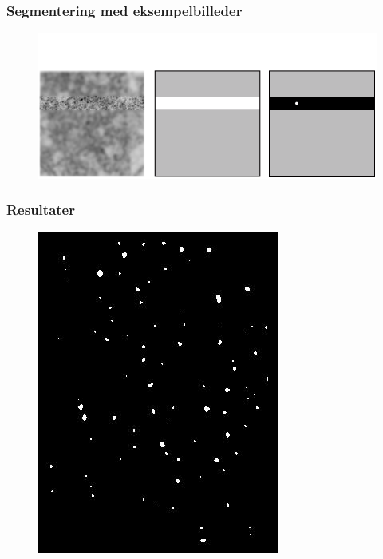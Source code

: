\documentclass[12pt,t]{beamer}
\begin{document}
\begin{frame}
\frametitle{Segmentering med eksempelbilleder}
\begin{figure}[H]
\includegraphics[scale=0.35]{img/afstand/16.png}
\end{figure}
\end{frame}



\begin{frame}
\frametitle{Resultater}
\begin{figure}[H]
	\centering
	\includegraphics[scale=0.4]{../files/postmethod/img/3.jpg}
\end{figure}
\end{frame}
\end{document}
